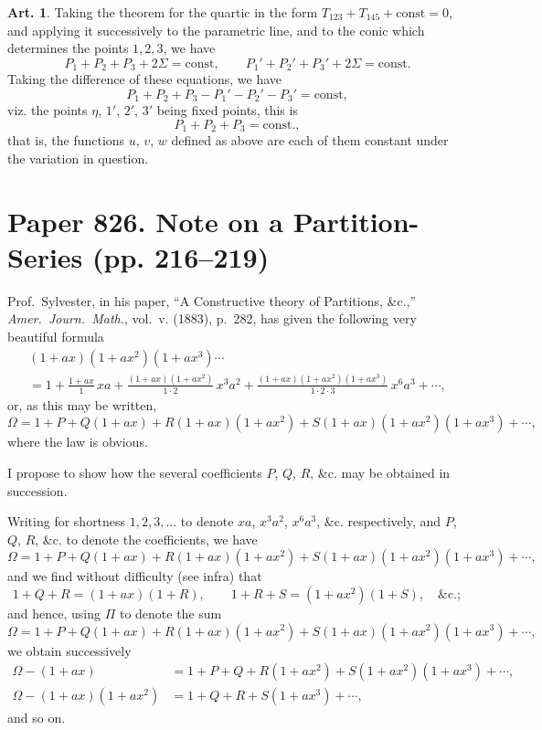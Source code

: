 \documentclass[11pt,a4paper]{article}
\theoremstyle{definition}
\newtheorem{art}{Art.}[section]
\begin{document}
\begin{art}
Taking the theorem for the quartic in the form $T_{123} + T_{145} + \text{const} = 0$, and applying it successively to the parametric line, and to the conic which determines the points $1,2,3$, we have
\[
P_1 + P_2 + P_3 + 2\Sigma = \text{const}, \qquad P_1' + P_2' + P_3' + 2\Sigma = \text{const}.
\]
Taking the difference of these equations, we have
\[
P_1 + P_2 + P_3 - P_1' - P_2' - P_3' = \text{const},
\]
viz. the points $\eta$, $1'$, $2'$, $3'$ being fixed points, this is
\[
P_1 + P_2 + P_3 = \text{const.},
\]
that is, the functions $u$, $v$, $w$ defined as above are each of them constant under the variation in question.
\end{art}

\newpage
\section{Paper 826. Note on a Partition-Series (pp. 216--219)}


Prof.~Sylvester, in his paper, ``A Constructive theory of Partitions, \&c.,'' \textit{Amer.\ Journ.\ Math.}, vol.~v. (1883), p.~282, has given the following very beautiful formula
\begin{multline*}
(1+ax)(1+ax^2)(1+ax^3)\cdots \\
= 1 + \frac{1+ax}{1}\,xa + \frac{(1+ax)(1+ax^2)}{1\cdot 2}\,x^3a^2 + \frac{(1+ax)(1+ax^2)(1+ax^3)}{1\cdot 2\cdot 3}\,x^6a^3 + \cdots,
\end{multline*}
or, as this may be written,
\[
\Omega = 1 + P + Q(1+ax) + R(1+ax)(1+ax^2) + S(1+ax)(1+ax^2)(1+ax^3) + \cdots,
\]
where the law is obvious.

I propose to show how the several coefficients $P$, $Q$, $R$, \&c. may be obtained in succession.

Writing for shortness $1,2,3,\ldots$ to denote $xa$, $x^3a^2$, $x^6a^3$, \&c. respectively, and $P$, $Q$, $R$, \&c. to denote the coefficients, we have
\[
\Omega = 1 + P + Q(1+ax) + R(1+ax)(1+ax^2) + S(1+ax)(1+ax^2)(1+ax^3) + \cdots,
\]
and we find without difficulty (see infra) that
\[
1 + Q + R = (1+ax)(1+R), \qquad 1 + R + S = (1+ax^2)(1+S), \quad \text{\&c.};
\]
and hence, using $\Pi$ to denote the sum
\[
\Omega = 1 + P + Q(1+ax) + R(1+ax)(1+ax^2) + S(1+ax)(1+ax^2)(1+ax^3) + \cdots,
\]
we obtain successively
\begin{align*}
\Omega - (1+ax) &= 1 + P + Q + R(1+ax^2) + S(1+ax^2)(1+ax^3) + \cdots, \\
\Omega - (1+ax)(1+ax^2) &= 1 + Q + R + S(1+ax^3) + \cdots,
\end{align*}
and so on.
\end{document}
